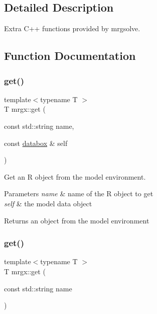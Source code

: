 \subsection{Detailed Description}
Extra C++ functions provided by mrgsolve. 



\subsection{Function Documentation}
\mbox{\label{group__mrgx_gab71fd80e9da8f4192219a9e258d2aab5}} 
\subsubsection{\texorpdfstring{get()}{get()}\hspace{0.1cm}{\footnotesize\ttfamily [1/3]}}
{\footnotesize\ttfamily template$<$typename T $>$ \\
T mrgx\+::get (\begin{DoxyParamCaption}\item[{const std\+::string}]{name,  }\item[{const \hyperlink{structdatabox}{databox} \&}]{self }\end{DoxyParamCaption})}

Get an R object from the model environment.


\begin{DoxyParams}{Parameters}
{\em name} & name of the R object to get \\
\hline
{\em self} & the model data object \\
\hline
\end{DoxyParams}
\begin{DoxyReturn}{Returns}
an object from the model environment 
\end{DoxyReturn}
\mbox{\label{group__mrgx_ga0500d813d7ce3a3c4c4a83e4d1dc4c31}} 
\subsubsection{\texorpdfstring{get()}{get()}\hspace{0.1cm}{\footnotesize\ttfamily [2/3]}}
{\footnotesize\ttfamily template$<$typename T $>$ \\
T mrgx\+::get (\begin{DoxyParamCaption}\item[{const std\+::string}]{name }\end{DoxyParamCaption})}

